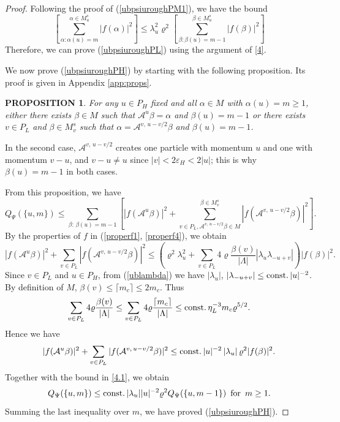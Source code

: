 \documentclass[11pt]{article}
\numberwithin{equation}{section}
\newcommand{\beq}{\begin{equation}}
\newcommand{\eeq}{\end{equation}}
\newcommand{\beqa}{\begin{eqnarray}}
\newcommand\eps{\varepsilon}
\newcommand\const{{\rm const.\, }}
\newcommand\al{{\alpha}}
\newcommand\be{\beta}
\renewcommand\rho\varrho
\newtheorem{prop}{PROPOSITION}[section]
\theoremstyle{definition}
\begin{document}
\begin{proof}
Following the proof of (\ref{ubpsiuroughPM1}), we have the bound 
\beq\label{pubrho3}
\left[\sum_{\al:\al(u)=m}^{\al\in M^s_u}|f(\al)|^2\right]\leq \lambda_u^2\rho^2\left[\sum_{\be:\be(u)=m-1}^{\be\in M^s_u}|f(\be)|^2\right]
\eeq
Therefore, we can  prove (\ref{ubpsiuroughPL}) using the  argument of \eqref{4}.


\bigskip 


\par  We now prove  (\ref{ubpsiuroughPH}) by starting with the following proposition. Its proof is given in Appendix \ref{app:props}.

\begin{prop}\label{prop2}
For any $u \in P_H$ fixed and  all
$\al\in M$ with $\al(u)=m\ge 1$,  either there exists   $\be\in M$ such that  $\mathcal A^{u}\beta=\al$ and $\be(u)=m-1$
or there exists $v \in P_L$ and $\be\in M_v^s$  such that  $ \alpha = \mathcal A^{v,\,u-v/2}  \beta$ and $\be(u)=m-1$.
\end{prop}
In the second case, $\mathcal A^{v,\,u-v/2}$ creates one particle with momentum $u$ and one with momentum $v-u$, and $v-u\neq u$ since $|v|<2\eps_H<2|u|$; this is why $\be(u)=m-1$ in both cases.

{F}rom this proposition,  we have
\beq\label{4.1}
 Q_\Psi(\{u,m\})\leq \sum_{\be:\,\be(u)=m-1}\left[\left|f(\mathcal A^{u}\beta)\right|^2+\sum_{v \in P_{L}, \mathcal A^{v,\,u-v/2}  \beta\in M}^{\be\in M_v^s}\left|f(\mathcal A^{v,\,u-v/2}  \beta)\right|^2\right].
\eeq
By  the properties of $f$ in (\ref{properf1}, \ref{properf4}), we obtain 
\[
|f( \mathcal A^u\be )|^2+\sum_{v\in P_{L} }|f(\mathcal A^{v,\,u-v/2}  \beta)|^2
\leq \left(\rho^2\lambda_u^2+\sum_{v\in P_{L}}4\rho\frac{\be(v)}{|\Lambda|}\left|\lambda_{u}\lambda_{-u+v}\right|\right)|f(\be)|^2 .
\]
Since  $v \in P_{L}$ and $ u \in P_{H}$, from (\ref{ublambda}) we have $\left|\lambda_u\right|$, 
$\left|\lambda_{-u+v}\right| \le \const |u|^{-2} $.  By definition of $M$, $\beta(v) \le \lceil m_{c}\rceil\le 2m_c$. Thus
\[
\sum_{v\in P_{L}}4\rho \frac{\be(v)}{|\Lambda|}
\le \sum_{v\in P_{L}}4\rho\frac{\lceil m_{c}\rceil}{|\Lambda|} \le \const\eta_{L}^{-3}m_c\rho^{5/2}.
\]
Hence  we have 
\[
|f( \mathcal A^u\be )|^2+\sum_{v\in P_{L}}|f(\mathcal A^{v,\,u-v/2}  \beta)|^2 \leq \const |u|^{-2}\left|\lambda_u\right|\rho^2|f(\be)|^2.
\]
Together with the bound in \eqref{4.1}, we obtain 
\beq\label{temp6.29}
 Q_\Psi(\{u,m\})\leq \const |\lambda_u| |u|^{-2}\rho^2 Q_\Psi(\{u,m-1\}){\rm\,\,\,for\,\,\,} m\geq 1 .
\eeq
Summing the last inequality over $m$, we have proved  (\ref{ubpsiuroughPH}). 

 
 
 
 \end{proof}
 
\end{document}
